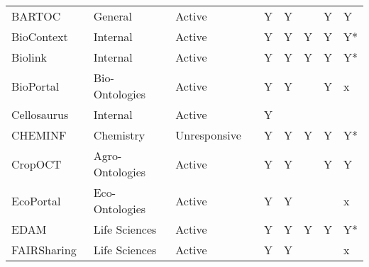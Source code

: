 \begin{table}
\begin{tabular}{lllllllll}
                                 BARTOC &         General &       Active &                           &                      Y &                              Y &                        &                    Y &                      Y \\
           BioContext~\cite{biocontext} &        Internal &       Active &                           &                      Y &                              Y &                      Y &                    Y &                     Y* \\
                Biolink~\cite{Unni2022} &        Internal &       Active &                           &                      Y &                              Y &                      Y &                    Y &                     Y* \\
           BioPortal~\cite{Whetzel2011} &  Bio-Ontologies &       Active &                           &                      Y &                              Y &                        &                    Y &                      x \\
         Cellosaurus~\cite{Bairoch2018} &        Internal &       Active &                           &                      Y &                                &                        &                      &                        \\
            CHEMINF~\cite{Hastings2011} &       Chemistry & Unresponsive &                           &                      Y &                              Y &                      Y &                    Y &                     Y* \\
              CropOCT~\cite{Arnaud2020} & Agro-Ontologies &       Active &                           &                      Y &                              Y &                        &                    Y &                      Y \\
      EcoPortal~\cite{Kechagioglou2021} &  Eco-Ontologies &       Active &                           &                      Y &                              Y &                        &                      &                      x \\
                   EDAM~\cite{Ison2013} &   Life Sciences &       Active &                           &                      Y &                              Y &                      Y &                    Y &                     Y* \\
         FAIRSharing~\cite{Sansone2019} &   Life Sciences &       Active &                           &                      Y &                              Y &                        &                      &                      x \\

\end{tabular}
\end{table}
